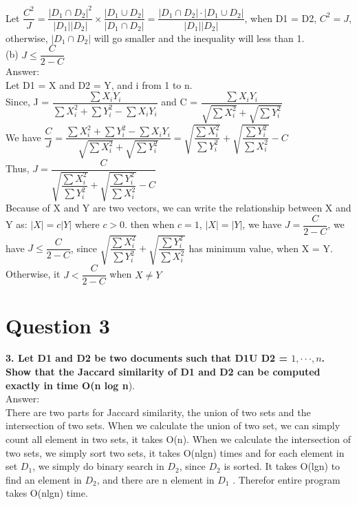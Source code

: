 \documentclass{article}
\begin{document}
Let $\dfrac{C^{2}}{J} = \dfrac{|D_{1} \cap D_{2}|^{2}}{|D_{1}||D_{2}|} \times \dfrac{|D_{1} \cup D_{2}|}{|D_{1} \cap D_{2}|} = \dfrac{|D_{1} \cap D_{2}| \cdot |D_{1} \cup D_{2}|}{|D_{1}||D_{2}|}$, when D1 = D2,  $C^{2} = J$, otherwise, $|D_{1} \cap D_{2}|$ will go smaller and the inequality will less than 1.\\

(b) $J \leq \dfrac{C}{2-C}$\\

Answer:\\

Let D1 = X and D2 = Y, and i from 1 to n.\\

Since, J = $\dfrac{\sum{X_{i}Y_{i}}} {\sum{X_{i}^{2}} + \sum{Y_{i}^{2}} - \sum{X_{i}Y_{i}}} $ and C =  $\dfrac{\sum{X_{i}Y_{i}}} { \sqrt{\sum{X_{i}^{2}}} + \sqrt{\sum{Y_{i}^{2}}}} $\\

We have $\dfrac{C}{J} = \dfrac{\sum{X_{i}^{2}} + \sum{Y_{i}^{2}} - \sum{X_{i}Y_{i}}}{ \sqrt{\sum{X_{i}^{2}}} + \sqrt{\sum{Y_{i}^{2}}}} = \sqrt{\dfrac{\sum{X_{i}^{2}}}{\sum{Y_{i}^{2}}}} + \sqrt{\dfrac{\sum{Y_{i}^{2}}}{\sum{X_{i}^{2}}}} - C$\\

Thus, $J = \dfrac{C}{\sqrt{\dfrac{\sum{X_{i}^{2}}}{\sum{Y_{i}^{2}}}} + \sqrt{\dfrac{\sum{Y_{i}^{2}}}{\sum{X_{i}^{2}}}} - C}$\\

Because of X and Y are two vectors, we can write the relationship between X and Y as: $|X| = c |Y|$ where $c > 0$.
then when $c = 1$, $|X| = |Y|$, we have $J = \dfrac{C}{2-C}$, we have $J \leq \dfrac{C}{2-C}$, since $\sqrt{\dfrac{\sum{X_{i}^{2}}}{\sum{Y_{i}^{2}}}} + \sqrt{\dfrac{\sum{Y_{i}^{2}}}{\sum{X_{i}^{2}}}}$ has minimum value, when X = Y. Otherwise, it $J < \dfrac{C}{2-C}$ when $X \neq Y$

\clearpage

\section{Question 3}
\textbf{3. Let D1 and D2 be two documents such that D1U D2 = ${1, · · · , n}$. Show that the Jaccard
similarity of D1 and D2 can be computed exactly in time O(n log n}).\\

Answer:\\

There are two parts for Jaccard similarity, the union of two sets and the intersection of two sets. When we calculate the union of two set, we can simply count all element in two sets, it takes O(n). When we calculate the intersection of two sets, we simply sort two sets, it takes O(nlgn) times and for each element in set $D_{1}$, we simply do binary search in $D_{2}$, since $D_{2}$ is sorted. It takes O(lgn) to find an element in $D_{2}$, and there are n element in $D_{1}$ . Therefor entire program takes O(nlgn) time.
\end{document}

